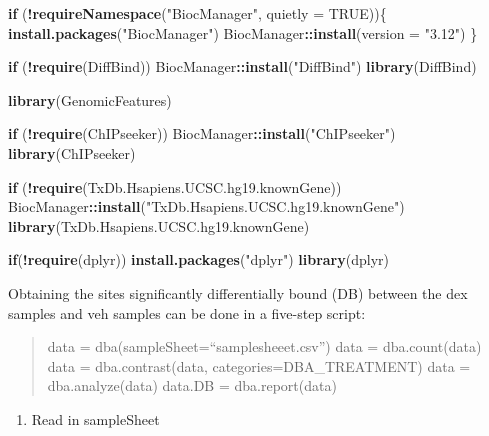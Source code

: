 \documentclass[
]{article}
\newenvironment{Shaded}{\begin{snugshade}}{\end{snugshade}}
\newcommand{\ControlFlowTok}[1]{\textcolor[rgb]{0.13,0.29,0.53}{\textbf{#1}}}
\newcommand{\DataTypeTok}[1]{\textcolor[rgb]{0.13,0.29,0.53}{#1}}
\newcommand{\KeywordTok}[1]{\textcolor[rgb]{0.13,0.29,0.53}{\textbf{#1}}}
\newcommand{\NormalTok}[1]{#1}
\newcommand{\OperatorTok}[1]{\textcolor[rgb]{0.81,0.36,0.00}{\textbf{#1}}}
\newcommand{\OtherTok}[1]{\textcolor[rgb]{0.56,0.35,0.01}{#1}}
\newcommand{\StringTok}[1]{\textcolor[rgb]{0.31,0.60,0.02}{#1}}
\providecommand{\tightlist}{%
  \setlength{\itemsep}{0pt}\setlength{\parskip}{0pt}}
\begin{document}
\begin{Shaded}
\begin{Highlighting}[]
\ControlFlowTok{if}\NormalTok{ (}\OperatorTok{!}\KeywordTok{requireNamespace}\NormalTok{(}\StringTok{"BiocManager"}\NormalTok{, }\DataTypeTok{quietly =} \OtherTok{TRUE}\NormalTok{))\{}
  \KeywordTok{install.packages}\NormalTok{(}\StringTok{"BiocManager"}\NormalTok{)}
\NormalTok{  BiocManager}\OperatorTok{::}\KeywordTok{install}\NormalTok{(}\DataTypeTok{version =} \StringTok{"3.12"}\NormalTok{)}
\NormalTok{\}}
  
\ControlFlowTok{if}\NormalTok{ (}\OperatorTok{!}\KeywordTok{require}\NormalTok{(DiffBind))}
\NormalTok{  BiocManager}\OperatorTok{::}\KeywordTok{install}\NormalTok{(}\StringTok{"DiffBind"}\NormalTok{)}
\KeywordTok{library}\NormalTok{(DiffBind)  }

\KeywordTok{library}\NormalTok{(GenomicFeatures)}

\ControlFlowTok{if}\NormalTok{ (}\OperatorTok{!}\KeywordTok{require}\NormalTok{(ChIPseeker))}
\NormalTok{  BiocManager}\OperatorTok{::}\KeywordTok{install}\NormalTok{(}\StringTok{"ChIPseeker"}\NormalTok{)}
\KeywordTok{library}\NormalTok{(ChIPseeker) }

\ControlFlowTok{if}\NormalTok{ (}\OperatorTok{!}\KeywordTok{require}\NormalTok{(TxDb.Hsapiens.UCSC.hg19.knownGene))}
\NormalTok{  BiocManager}\OperatorTok{::}\KeywordTok{install}\NormalTok{(}\StringTok{"TxDb.Hsapiens.UCSC.hg19.knownGene"}\NormalTok{)}
\KeywordTok{library}\NormalTok{(TxDb.Hsapiens.UCSC.hg19.knownGene)}

\ControlFlowTok{if}\NormalTok{(}\OperatorTok{!}\KeywordTok{require}\NormalTok{(dplyr))}
  \KeywordTok{install.packages}\NormalTok{(}\StringTok{"dplyr"}\NormalTok{)}
\KeywordTok{library}\NormalTok{(dplyr)}
\end{Highlighting}
\end{Shaded}

Obtaining the sites significantly differentially bound (DB) between the
dex samples and veh samples can be done in a five-step script:

\begin{quote}
data = dba(sampleSheet=``samplesheeet.csv'') data = dba.count(data) data
= dba.contrast(data, categories=DBA\_TREATMENT) data = dba.analyze(data)
data.DB = dba.report(data)
\end{quote}

\begin{enumerate}
\def\labelenumi{\arabic{enumi}.}
\tightlist
\item
  Read in sampleSheet
\end{enumerate}
\end{document}
